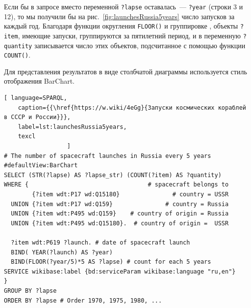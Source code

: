 Если бы в запросе вместо переменной \lstinline|?lapse| оставалась~--- \lstinline|?year| (строки 3 и 12), 
то мы получили бы на рис.~\ref{fig:launchesRussia5years} 
число запусков за каждый год. 
Благодаря функции округления \lstinline|FLOOR()|
и группировке%
, 
объекты \lstinline|?item|, имеющие запуски, группируются за пятилетний период, 
и в переменную \lstinline|?quantity| записывается число этих объектов, 
подсчитанное с помощью функции \lstinline|COUNT()|.

Для представления результатов в виде столбчатой диаграммы используется стиль отображения BarChart.

\label{question:spacecraft_1}


\begin{lstlisting}[ language=SPARQL, 
    caption={{\href{https://w.wiki/4eGg}{Запуски космических кораблей в СССР и России}}}, 
    label=lst:launchesRussia5years,
    texcl
                  ]
# The number of spacecraft launches in Russia every 5 years
#defaultView:BarChart
SELECT (STR(?lapse) AS ?lapse_str) (COUNT(?item) AS ?quantity)
WHERE {                                  # spacecraft belongs to
        {?item wdt:P17 wd:Q15180}               # country = USSR
  UNION {?item wdt:P17 wd:Q159}               # country = Russia
  UNION {?item wdt:P495 wd:Q159}    # country of origin = Russia
  UNION {?item wdt:P495 wd:Q15180}.  # country of origin =  USSR
  
  ?item wdt:P619 ?launch. # date of spacecraft launch
  BIND( YEAR(?launch) AS ?year) 
  BIND(FLOOR(?year/5)*5 AS ?lapse) # count for each 5 years
SERVICE wikibase:label {bd:serviceParam wikibase:language "ru,en"}
} 
GROUP BY ?lapse
ORDER BY ?lapse # Order 1970, 1975, 1980, ...
\end{lstlisting}

